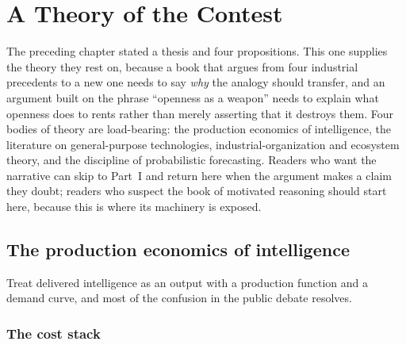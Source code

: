 \chapter{A Theory of the Contest}
\label{ch:theory}

The preceding chapter stated a thesis and four propositions. This one supplies the theory they rest on, because a book that argues from four industrial precedents to a new one needs to say \emph{why} the analogy should transfer, and an argument built on the phrase ``openness as a weapon'' needs to explain what openness does to rents rather than merely asserting that it destroys them. Four bodies of theory are load-bearing: the production economics of intelligence, the literature on general-purpose technologies, industrial-organization and ecosystem theory, and the discipline of probabilistic forecasting. Readers who want the narrative can skip to Part~I and return here when the argument makes a claim they doubt; readers who suspect the book of motivated reasoning should start here, because this is where its machinery is exposed.

\section{The production economics of intelligence}
\label{sec:production}

Treat delivered intelligence as an output with a production function and a demand curve, and most of the confusion in the public debate resolves.

\subsection{The cost stack}

